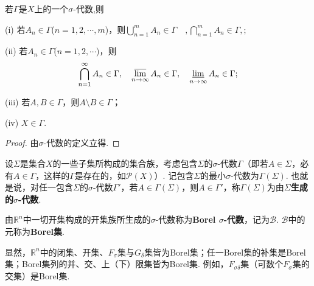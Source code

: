 \documentclass[../../main.tex]{subfiles}
\begin{document}
\begin{proposition}\label{proposition:σ-代数的基本性质}
若$\Gamma$是$X$上的一个$\sigma$-代数,则

(i) 若$A_n\in\Gamma$($n = 1,2,\cdots,m$)，则$\bigcup_{n = 1}^{m}A_n\in\Gamma\quad ,\bigcap_{n = 1}^{m}A_n\in\Gamma, $;

(ii) 若$A_n\in\Gamma$($n = 1,2,\cdots$)，则
\begin{align*}
\bigcap_{n = 1}^{\infty}A_n\in\Gamma, \quad \varlimsup_{n\to\infty}A_n\in\Gamma, \quad \varliminf_{n\to\infty}A_n\in\Gamma;
\end{align*}

(iii) 若$A,B\in\Gamma$，则$A\setminus B\in\Gamma$；

(iv) $X\in\Gamma$. 
\end{proposition}
\begin{proof}
由$\sigma$-代数的定义立得.
\end{proof}

\begin{definition}[生成$\sigma$-代数]
设$\Sigma$是集合$X$的一些子集所构成的集合族，考虑包含$\Sigma$的$\sigma$-代数$\Gamma$（即若$A\in\Sigma$，必有$A\in\Gamma$，这样的$\Gamma$是存在的，如$\mathcal{P}(X)$）. 记包含$\Sigma$的最小$\sigma$-代数为$\Gamma(\Sigma)$. 也就是说，对任一包含$\Sigma$的$\sigma$-代数$\Gamma'$，若$A\in\Gamma(\Sigma)$，则$A\in\Gamma'$，称$\Gamma(\Sigma)$为由\textbf{$\Sigma$生成的$\sigma$-代数}.
\end{definition}

\begin{definition}
由$\mathbb{R}^n$中一切开集构成的开集族所生成的$\sigma$-代数称为\textbf{Borel $\sigma$-代数}，记为$\mathscr{B}$. $\mathscr{B}$中的元称为\textbf{Borel集}.
\end{definition}
\begin{note}
显然，$\mathbb{R}^n$中的闭集、开集、$F_{\sigma}$集与$G_{\delta}$集皆为Borel集；任一Borel集的补集是Borel集；Borel集列的并、交、上（下）限集皆为Borel集. 例如，$F_{\sigma\delta}$集（可数个$F_{\sigma}$集的交集）是Borel集.
\end{note}
\end{document}
